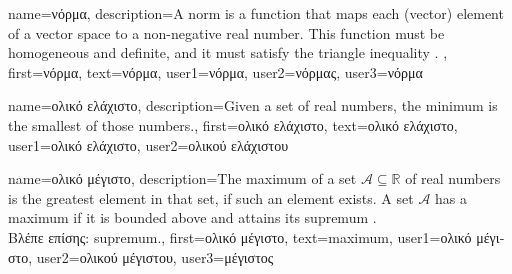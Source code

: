 {name={\foreignlanguage{greek}{νόρμα}},
	description={A norm is a function that maps each (vector) element 
		of a vector space to a non-negative real number. This function must be 
		homogeneous and definite, and it must satisfy the triangle inequality \cite{HornMatAnalysis}.  },
	first={\foreignlanguage{greek}{νόρμα}},
	text={\foreignlanguage{greek}{νόρμα}},
	user1={\foreignlanguage{greek}{νόρμα}}, %
    	user2={\foreignlanguage{greek}{νόρμας}}, %
	user3={\foreignlanguage{greek}{νόρμα}} %
}


{name={\foreignlanguage{greek}{ολικό ελάχιστο}},
	description={Given a set of real numbers, the minimum is the smallest of those numbers.},
	first={\foreignlanguage{greek}{ολικό ελάχιστο}},
	text={\foreignlanguage{greek}{ολικό ελάχιστο}},
	user1={\foreignlanguage{greek}{ολικό ελάχιστο}}, %
	user2={\foreignlanguage{greek}{ολικού ελάχιστου}} %
}

{name={\foreignlanguage{greek}{ολικό μέγιστο}},
     description={The maximum of a set $\mathcal{A} \subseteq \mathbb{R}$ 
     	of real numbers is the greatest element in that set, if such an element exists. A set $\mathcal{A}$ 
     	has a maximum if it is bounded above and attains its \gls{supremum} \cite[Sec.~1.4]{RudinBookPrinciplesMatheAnalysis}.\\
	\foreignlanguage{greek}{Βλέπε επίσης:} \gls{supremum}.},
 first={\foreignlanguage{greek}{ολικό μέγιστο}},
 text={maximum},
 user1={\foreignlanguage{greek}{ολικό μέγιστο}}, %
 user2={\foreignlanguage{greek}{ολικού μέγιστου}}, %
 user3={\foreignlanguage{greek}{μέγιστος}} %
}

